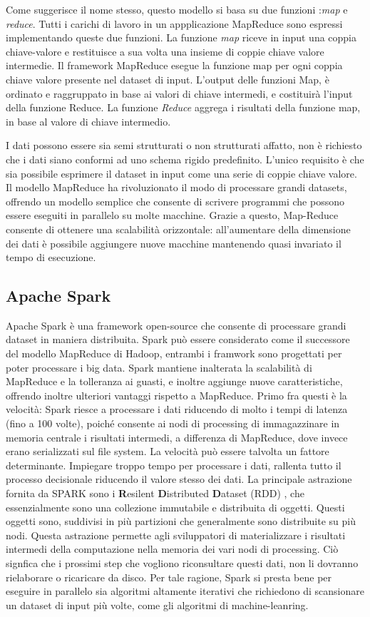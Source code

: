 Come suggerisce il nome stesso, questo modello si basa su due funzioni :\emph{map}   e \emph{reduce}. Tutti i carichi di lavoro in un appplicazione MapReduce sono espressi implementando queste due funzioni.
La funzione \emph{map} riceve in input una coppia chiave-valore e restituisce a sua volta una insieme di  coppie chiave valore intermedie. Il framework MapReduce esegue la funzione map per ogni coppia chiave valore presente nel dataset di input. L'output delle funzioni Map, è ordinato e raggruppato in base ai valori di chiave intermedi, e costituirà l'input della funzione Reduce. La funzione \emph{Reduce} aggrega i risultati della funzione map, in base al valore di chiave intermedio.

I dati possono essere sia semi strutturati o non strutturati affatto, non è richiesto che i dati siano conformi ad uno schema rigido predefinito. L'unico requisito è che sia possibile esprimere il dataset in input come una serie di coppie chiave valore.
Il modello MapReduce ha rivoluzionato il modo di processare grandi datasets, offrendo un modello semplice che consente di scrivere programmi che possono essere eseguiti in parallelo su molte macchine. Grazie a questo, Map-Reduce consente di ottenere una scalabilità orizzontale: all'aumentare della dimensione dei dati è possibile aggiungere nuove macchine mantenendo quasi invariato il tempo di esecuzione.
\subsection{Apache Spark}
Apache Spark \cite{Zaharia:2010:SCC:1863103.1863113} è una framework open-source che consente di processare grandi dataset in maniera distribuita.
Spark può essere considerato come il successore del modello MapReduce di Hadoop, entrambi i framwork sono progettati per poter processare i big data.  Spark mantiene inalterata la scalabilità di MapReduce e la tolleranza ai guasti, e inoltre aggiunge nuove caratteristiche, offrendo inoltre ulteriori vantaggi rispetto a MapReduce. Primo fra questi è la velocità: Spark riesce a processare i dati riducendo  di molto i tempi di latenza (fino a 100 volte), poiché  consente ai nodi di processing di immagazzinare in memoria centrale i risultati intermedi, a differenza di MapReduce, dove invece erano serializzati sul file system.  La velocità può essere talvolta un fattore determinante. Impiegare troppo tempo per processare i dati, rallenta tutto il processo decisionale riducendo il valore stesso dei dati.
La principale astrazione fornita da SPARK sono i \textbf{R}esilent \textbf{D}istributed \textbf{D}ataset (RDD) \cite{Zaharia:2012:RDD:2228298.2228301}, che essenzialmente sono una collezione immutabile e distribuita di oggetti. Questi oggetti sono, suddivisi in più partizioni che  generalmente sono distribuite su più nodi.
Questa astrazione permette agli sviluppatori di materializzare i risultati intermedi della computazione  nella memoria dei vari nodi di processing. Ciò signfica che i prossimi step che vogliono riconsultare questi dati, non li dovranno rielaborare o ricaricare da disco.
Per tale ragione, Spark si presta bene per eseguire in parallelo sia algoritmi altamente iterativi che richiedono di scansionare un dataset di input più volte, come gli algoritmi di machine-leanring.

